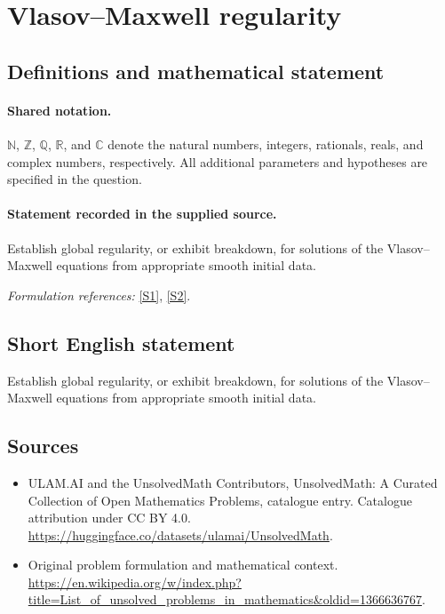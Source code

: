 \documentclass[11pt]{article}
\newcommand{\sref}[2]{\hyperlink{source:#1:#2}{[S#2]}}
\begin{document}
\section{Vlasov–Maxwell regularity}\label{statement}

\subsection{Definitions and mathematical statement}

\paragraph{Shared notation.}$\mathbb N$, $\mathbb Z$, $\mathbb Q$, $\mathbb R$, and $\mathbb C$ denote the natural numbers, integers, rationals, reals, and complex numbers, respectively. All additional parameters and hypotheses are specified in the question.


\paragraph{Statement recorded in the supplied source.}
Establish global regularity, or exhibit breakdown, for solutions of the Vlasov–Maxwell equations from appropriate smooth initial data.
\par\smallskip\textit{Formulation references:} \sref{statement}{1}, \sref{statement}{2}.
\subsection{Short English statement}
Establish global regularity, or exhibit breakdown, for solutions of the Vlasov–Maxwell equations from appropriate smooth initial data.
\subsection{Sources}
\begin{itemize}
\item[\hypertarget{source:statement:1}{S1}] ULAM.AI and the UnsolvedMath Contributors, UnsolvedMath: A Curated Collection of Open Mathematics Problems, catalogue entry. Catalogue attribution under CC BY 4.0.
\url{https://huggingface.co/datasets/ulamai/UnsolvedMath}.
\item[\hypertarget{source:statement:2}{S2}] Original problem formulation and mathematical context.
\url{https://en.wikipedia.org/w/index.php?title=List_of_unsolved_problems_in_mathematics&oldid=1366636767}.
\end{itemize}
\label{end:statement}
\end{document}
